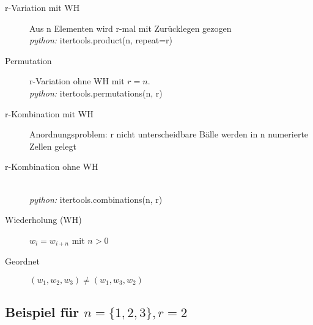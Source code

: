\documentclass[a4paper,twocolumn]{article}
\begin{document}
\begin{description}
  \item[r-Variation mit WH]
    Aus n Elementen wird r-mal mit Zurücklegen gezogen \\
    \emph{python:} itertools.product(n, repeat=r)
  \item[Permutation]
    r-Variation ohne WH mit $r=n$. \\
    \emph{python:} itertools.permutations(n, r)
  \item[r-Kombination mit WH] Anordnungsproblem:
    r nicht unterscheidbare Bälle werden in n numerierte Zellen gelegt
  \item[r-Kombination ohne WH] \hfill{} \\
    \emph{python:} itertools.combinations(n, r) \\
  \item[Wiederholung (WH)]
    $w_i = w_{i+n}$ mit $n>0$
  \item[Geordnet] $(w_1, w_2, w_3) \neq (w_1, w_3, w_2)$
\end{description}

\subsection{Beispiel für $n=\{1,2,3\}, r=2$}
\end{document}

